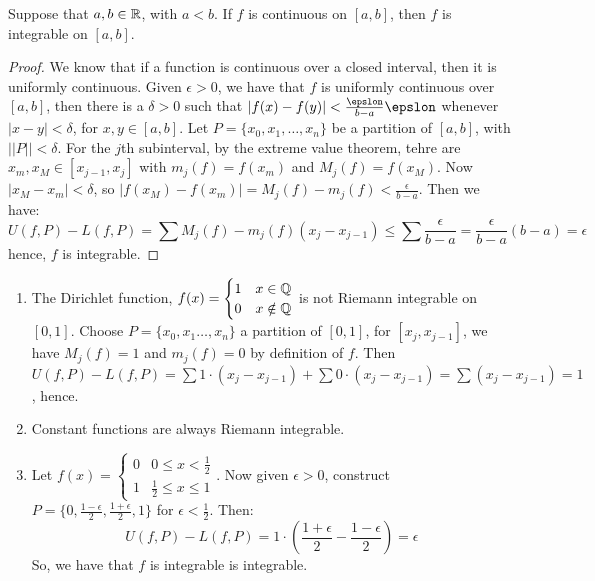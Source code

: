 \begin{theorem}\label{5.1.3}
    Suppose that $a,b \in \mathbb{R}$, with  $a<b$. If  $f$ is continuous on  $[a,b]$, then  $f$ is integrable on  $[a,b]$.
\end{theorem}
\begin{proof}
    We know that if a function is continuous over a closed interval, then it is uniformly continuous.
    Given  $\epsilon>0$, we have that  $f$ is uniformly continuous over  $[a,b]$, then there is a  $\delta>0$ such that $|f(x)-f(y)|<\frac{\epslon}{b-a}\epslon$ whenever $|x-y|<\delta$, for  $x,y \in [a,b]$.
    Let $P=\{x_0,x_1, \dots, x_n\}$ be a partition of $[a,b]$, with  $||P||<\delta$. For the  $j$th subinterval, by the extreme value theorem, tehre are $x_m, x_M \in [x_{j-1},x_j]$ with $m_j(f)=f(x_m)$ and  $M_j(f)=f(x_M)$.
    Now  $|x_M-x_m|<\delta$, so  $|f(x_M)-f(x_m)|=M_j(f)-m_j(f)<\frac{\epsilon}{b-a}$.
    Then we have:
        \begin{equation*}
            U(f,P)-L(f,P)=\sum{M_j(f)-m_j(f)(x_j-x_{j-1})} \leq \sum{\frac{\epsilon}{b-a}}=\frac{\epsilon}{b-a}(b-a)=\epsilon
        \end{equation*} 
hence, $f$ is integrable.
\end{proof}

\begin{example}
    \begin{enumerate}[label=(\arabic*)]
        \item The Dirichlet function, $f(x)=\begin{cases}
                1 & x \in \mathbb{Q} \\
                0 & x \notin \mathbb{Q} \\
            \end{cases}$
            is not Riemann integrable on $[0,1]$.
            Choose $P=\{x_0,x_1 \dots , x_n\}$ a partition of $[0,1]$, for  $[x_j,x_{j-1}]$, we have  $M_j(f)=1$ and  $m_j(f)=0$ by definition of  $f$. Then  $U(f,P)-L(f,P)=\sum{1 \cdot (x_j-x_{j-1})}+\sum{0 \cdot (x_j-x_{j-1})}=\sum{(x_j-x_{j-1})}=1$, hence.

    \item Constant functions are always Riemann integrable.

    \item Let $f(x)=\begin{cases}
            0 & 0 \leq x<\frac{1}{2} \\
            1 & \frac{1}{2} \leq x \leq 1
        \end{cases}$.
        Now given $\epsilon>0$, construct  $P=\{0,\frac{1-\epsilon}{2},\frac{1+\epsilon}{2},1\}$ for $\epsilon<\frac{1}{2}$. Then:
        \begin{equation}
            U(f,P)-L(f,P)= 1 \cdot (\frac{1+\epsilon}{2}-\frac{1-\epsilon}{2})=\epsilon		
        \end{equation} 
        So, we have that $f$ is integrable is integrable.
    \end{enumerate}
\end{example} 

